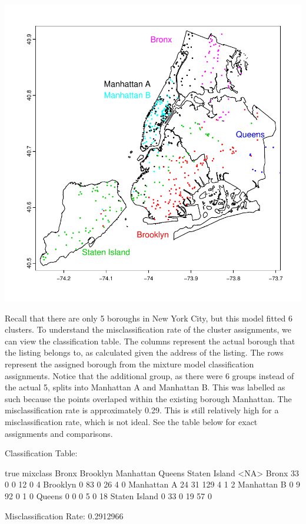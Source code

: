\documentclass[11pt, a4paper]{article}
\begin{document}
\includegraphics{project_report-022}



Recall that there are only 5 boroughs in New York City, but this model fitted 6 clusters. To understand the misclassification rate of the cluster assignments, we can view the classification table. The columns represent the actual borough that the listing belongs to, as calculated given the address of the listing. The rows represent the assigned borough from the mixture model classification assignments. Notice that the additional group, as there were 6 groups instead of the actual 5, splits into Manhattan A and Manhattan B. This was labelled as such because the points overlaped within the existing borough Manhattan. The misclassification rate is approximately 0.29. This is still relatively high for a misclassification rate, which is not ideal. See the table below for exact assignments and comparisons.

\begin{Schunk}
\begin{Soutput}
Classification Table:
\end{Soutput}
\begin{Soutput}
               true
mixclass        Bronx Brooklyn Manhattan Queens Staten Island <NA>
  Bronx            33        0         0     12             0    4
  Brooklyn          0       83         0     26             4    0
  Manhattan A      24       31       129      4             1    2
  Manhattan B       0        9        92      0             1    0
  Queens            0        0         0      5             0   18
  Staten Island     0       33         0     19            57    0
\end{Soutput}
\begin{Soutput}
Misclassification Rate: 0.2912966
\end{Soutput}
\end{Schunk}
\end{document}
